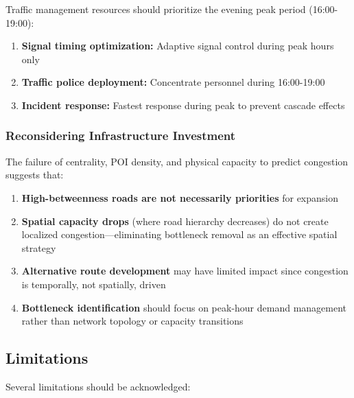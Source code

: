 \documentclass[12pt,a4paper]{article}
\begin{document}
Traffic management resources should prioritize the evening peak period (16:00-19:00):

\begin{enumerate}
\def\labelenumi{\arabic{enumi}.}

\item
  \textbf{Signal timing optimization:} Adaptive signal control during peak hours only
\item
  \textbf{Traffic police deployment:} Concentrate personnel during 16:00-19:00
\item
  \textbf{Incident response:} Fastest response during peak to prevent cascade effects
\end{enumerate}

\subsubsection{Reconsidering Infrastructure Investment}

The failure of centrality, POI density, and physical capacity to predict congestion suggests that:

\begin{enumerate}
\def\labelenumi{\arabic{enumi}.}

\item
  \textbf{High-betweenness roads are not necessarily priorities} for expansion
\item
  \textbf{Spatial capacity drops} (where road hierarchy decreases) do not create localized congestion---eliminating bottleneck removal as an effective spatial strategy
\item
  \textbf{Alternative route development} may have limited impact since congestion is temporally, not spatially, driven
\item
  \textbf{Bottleneck identification} should focus on peak-hour demand management rather than network topology or capacity transitions
\end{enumerate}

\subsection{Limitations}

Several limitations should be acknowledged:
\end{document}
